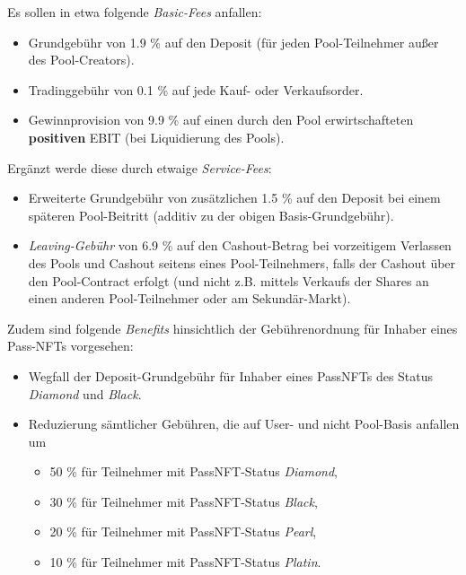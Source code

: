 \begin{Assumption}[Gebühren]\label{fees}

Es sollen in etwa folgende \textit{Basic-Fees} anfallen:

\begin{itemize}
	\item Grundgebühr von 1.9 \% auf den Deposit (für jeden Pool-Teilnehmer außer des Pool-Creators).
	\item Tradinggebühr von 0.1 \% auf jede Kauf- oder Verkaufsorder.
	\item Gewinnprovision von 9.9 \% auf einen durch den Pool erwirtschafteten \textbf{positiven} EBIT (bei Liquidierung des Pools).
\end{itemize}

\vspace{0.2cm}

Ergänzt werde diese durch etwaige \textit{Service-Fees}: 

\begin{itemize}
	\item Erweiterte Grundgebühr von zusätzlichen 1.5 \% auf den Deposit bei einem späteren Pool-Beitritt (additiv zu der obigen Basis-Grundgebühr).
	\item \textit{Leaving-Gebühr} von 6.9 \% auf den Cashout-Betrag bei vorzeitigem Verlassen des Pools und Cashout seitens eines Pool-Teilnehmers, falls der Cashout über den Pool-Contract erfolgt (und nicht z.B. mittels Verkaufs der Shares an einen anderen Pool-Teilnehmer oder am Sekundär-Markt).
\end{itemize}

\vspace{0.2cm}

Zudem sind folgende \textit{Benefits} hinsichtlich der Gebührenordnung für Inhaber eines Pass-NFTs  vorgesehen:

\begin{itemize}
	\item Wegfall der Deposit-Grundgebühr für Inhaber eines PassNFTs des Status \textit{Diamond} und \textit{Black}.
	\item Reduzierung sämtlicher Gebühren, die auf User- und nicht Pool-Basis anfallen um
	\begin{itemize}
		\item 50 \% für Teilnehmer mit PassNFT-Status \textit{Diamond},
		\item 30 \% für Teilnehmer mit PassNFT-Status \textit{Black},
		\item 20 \% für Teilnehmer mit PassNFT-Status \textit{Pearl},
		\item 10 \% für Teilnehmer mit PassNFT-Status \textit{Platin}.
	\end{itemize}
\end{itemize}


\end{Assumption}
